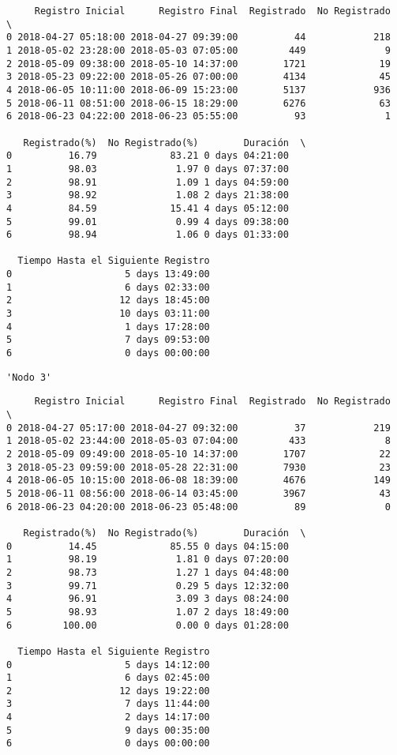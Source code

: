 \documentclass[11pt]{article}
\begin{document}
    \begin{verbatim}
     Registro Inicial      Registro Final  Registrado  No Registrado  \
0 2018-04-27 05:18:00 2018-04-27 09:39:00          44            218   
1 2018-05-02 23:28:00 2018-05-03 07:05:00         449              9   
2 2018-05-09 09:38:00 2018-05-10 14:37:00        1721             19   
3 2018-05-23 09:22:00 2018-05-26 07:00:00        4134             45   
4 2018-06-05 10:11:00 2018-06-09 15:23:00        5137            936   
5 2018-06-11 08:51:00 2018-06-15 18:29:00        6276             63   
6 2018-06-23 04:22:00 2018-06-23 05:55:00          93              1   

   Registrado(%)  No Registrado(%)        Duración  \
0          16.79             83.21 0 days 04:21:00   
1          98.03              1.97 0 days 07:37:00   
2          98.91              1.09 1 days 04:59:00   
3          98.92              1.08 2 days 21:38:00   
4          84.59             15.41 4 days 05:12:00   
5          99.01              0.99 4 days 09:38:00   
6          98.94              1.06 0 days 01:33:00   

  Tiempo Hasta el Siguiente Registro  
0                    5 days 13:49:00  
1                    6 days 02:33:00  
2                   12 days 18:45:00  
3                   10 days 03:11:00  
4                    1 days 17:28:00  
5                    7 days 09:53:00  
6                    0 days 00:00:00  
    \end{verbatim}

    
    
    \begin{verbatim}
'Nodo 3'
    \end{verbatim}

    
    
    \begin{verbatim}
     Registro Inicial      Registro Final  Registrado  No Registrado  \
0 2018-04-27 05:17:00 2018-04-27 09:32:00          37            219   
1 2018-05-02 23:44:00 2018-05-03 07:04:00         433              8   
2 2018-05-09 09:49:00 2018-05-10 14:37:00        1707             22   
3 2018-05-23 09:59:00 2018-05-28 22:31:00        7930             23   
4 2018-06-05 10:15:00 2018-06-08 18:39:00        4676            149   
5 2018-06-11 08:56:00 2018-06-14 03:45:00        3967             43   
6 2018-06-23 04:20:00 2018-06-23 05:48:00          89              0   

   Registrado(%)  No Registrado(%)        Duración  \
0          14.45             85.55 0 days 04:15:00   
1          98.19              1.81 0 days 07:20:00   
2          98.73              1.27 1 days 04:48:00   
3          99.71              0.29 5 days 12:32:00   
4          96.91              3.09 3 days 08:24:00   
5          98.93              1.07 2 days 18:49:00   
6         100.00              0.00 0 days 01:28:00   

  Tiempo Hasta el Siguiente Registro  
0                    5 days 14:12:00  
1                    6 days 02:45:00  
2                   12 days 19:22:00  
3                    7 days 11:44:00  
4                    2 days 14:17:00  
5                    9 days 00:35:00  
6                    0 days 00:00:00  
    \end{verbatim}
\end{document}

